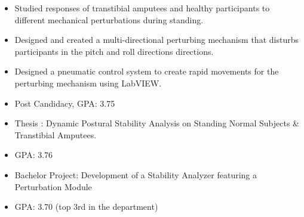 \documentclass[10pt,letter,ragged2e]{altacv}
\begin{document}
\divider

\begin{itemize}
\item Studied responses of transtibial amputees and healthy participants to different mechanical perturbations during standing.
\item Designed and created a multi-directional perturbing mechanism that disturbs participants in the pitch and roll directions directions.
\item Designed a pneumatic control system to create rapid movements for the perturbing mechanism using LabVIEW.
\end{itemize}


\begin{itemize}
\item Post Candidacy, GPA: 3.75
\end{itemize}

\divider

\begin{itemize}
\item Thesis : Dynamic Postural Stability Analysis on Standing Normal Subjects \& Transtibial Amputees.
\item GPA: 3.76
\end{itemize}

\divider

\begin{itemize}
\item Bachelor Project: Development of a Stability Analyzer featuring a
Perturbation Module
\item GPA: 3.70 (top 3rd in the department)
\end{itemize}

\clearpage


\nocite{*}
\end{document}
